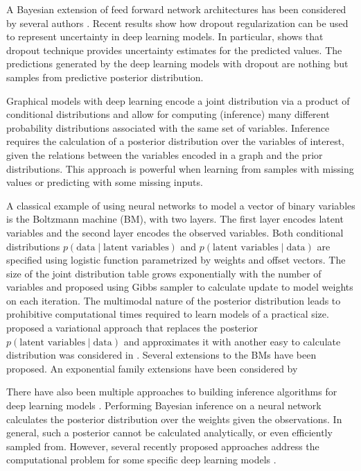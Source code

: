 \documentclass[12pt]{article}
\begin{document}
A Bayesian extension of feed forward network architectures has been considered by several authors \citep{neal1990learning,saul1996mean,frey1999variational,lawrence2005probabilistic,adams2010learning,mnih2014neural,kingma2013auto,rezende2014stochastic}. Recent results show how dropout regularization can be used to represent uncertainty in deep learning models.  In particular, \cite{Gal2015Theoretically} shows that dropout technique provides uncertainty estimates for the predicted values. The predictions generated by the deep learning models with dropout are nothing but samples from predictive posterior distribution.


Graphical models with deep learning encode a joint distribution via a product of conditional distributions and allow for computing (inference) many different probability distributions associated with the same set of variables. Inference requires the calculation of a posterior distribution over the variables of interest, given the relations between the variables encoded in a graph and the prior distributions. This approach is powerful when learning from samples with missing values or predicting with some missing inputs. 

A classical example of using neural  networks to model a vector of binary variables is the Boltzmann machine (BM), with two layers. The first layer encodes latent variables and the second layer encodes the observed variables. Both conditional distributions  $p(\text{data} \mid \text{latent variables})$ and $p(\text{latent variables} \mid \text{data})$ are specified using logistic function parametrized by weights and offset vectors. The size of the joint distribution table grows exponentially with the number of variables and \cite{hinton1983optimal} proposed using Gibbs sampler to calculate update to model weights on each iteration. The multimodal nature of the posterior distribution leads to prohibitive computational times required to learn models of a practical size. \cite{tieleman2008training} proposed a variational approach that replaces the  posterior $p(\text{latent variables} \mid \text{data})$  and approximates it with another easy to calculate distribution  was considered in \cite{salakhutdinov2008learning}. Several extensions to the BMs have been proposed. An exponential family extensions have been considered by \cite{smolensky1986,salakhutdinov2008learning,salakhutdinov2009deep,welling2005exponential}
 
There have also been multiple approaches to building inference algorithms for deep learning models \cite{mackay1992practical,hinton1993keeping,neal1992bayesian,barber1998ensemble}. Performing Bayesian inference on a neural network calculates the posterior distribution over the weights given the observations.  In general, such a posterior cannot be calculated analytically, or even efficiently sampled from. However, several recently proposed approaches address the computational problem for some specific deep learning models \citep{graves2011practical, kingma2013auto,rezende2014stochastic,blundell2015weight,hernandez2015probabilistic,gal2016dropout}.
\end{document}
